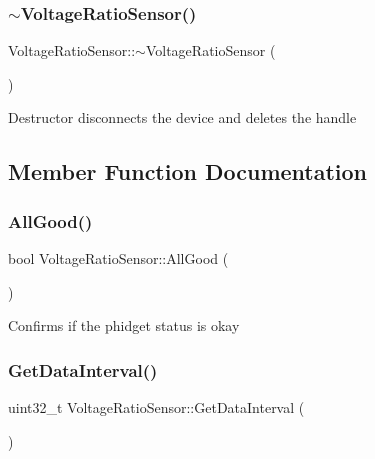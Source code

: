 \subsubsection{\texorpdfstring{$\sim$\+Voltage\+Ratio\+Sensor()}{~VoltageRatioSensor()}}
{\footnotesize\ttfamily Voltage\+Ratio\+Sensor\+::$\sim$\+Voltage\+Ratio\+Sensor (\begin{DoxyParamCaption}{ }\end{DoxyParamCaption})\hspace{0.3cm}{\ttfamily [inline]}}

Destructor disconnects the device and deletes the handle

\subsection{Member Function Documentation}
\mbox{\label{classVoltageRatioSensor_a33625c71e8e4a69be28360604ca14776}} 
\subsubsection{\texorpdfstring{All\+Good()}{AllGood()}}
{\footnotesize\ttfamily bool Voltage\+Ratio\+Sensor\+::\+All\+Good (\begin{DoxyParamCaption}{ }\end{DoxyParamCaption})\hspace{0.3cm}{\ttfamily [inline]}}

Confirms if the phidget status is okay\mbox{\label{classVoltageRatioSensor_a4b1e9f2f81dd65b741369a5680ffe3e0}} 
\subsubsection{\texorpdfstring{Get\+Data\+Interval()}{GetDataInterval()}}
{\footnotesize\ttfamily uint32\+\_\+t Voltage\+Ratio\+Sensor\+::\+Get\+Data\+Interval (\begin{DoxyParamCaption}{ }\end{DoxyParamCaption})\hspace{0.3cm}{\ttfamily [inline]}}

